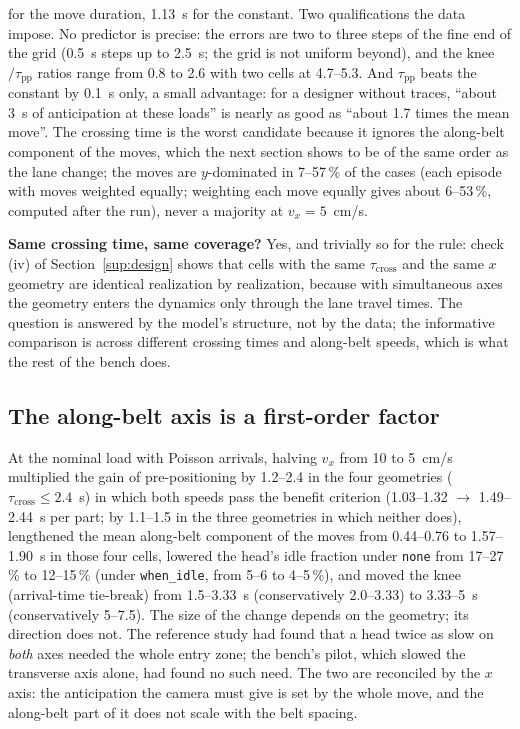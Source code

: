 \documentclass[11pt,a4paper]{article}
\newcommand{\tcross}{\tau_{\mathrm{cross}}}
\newcommand{\tpp}{\tau_{\mathrm{pp}}}
\begin{document}
for the move duration, 1.13~s for the constant. Two qualifications the data impose. No predictor
is precise: the errors are two to three steps of the fine end of the grid (0.5~s steps up to 2.5~s; the grid is not uniform beyond), and the knee$/\tpp$
ratios range from 0.8 to 2.6 with two cells at 4.7--5.3. And $\tpp$ beats the constant by
0.1~s only, a small advantage: for a designer without traces, ``about 3~s of anticipation
at these loads'' is nearly as good as ``about 1.7 times the mean move''. The crossing time is the worst candidate because it ignores
the along-belt component of the moves, which the next section shows to be of the same
order as the lane change; the moves are $y$-dominated in 7--57\,\% of the cases (each
episode with moves weighted equally; weighting each move equally gives about
6--53\,\%, computed after the run), never a majority at $v_x=5$~cm/s.

\textbf{Same crossing time, same coverage?} Yes, and trivially so for the rule: check (iv)
of Section~\ref{sup:design} shows that cells with the same $\tcross$ and the same $x$
geometry are identical realization by realization, because with simultaneous axes the
geometry enters the dynamics only through the lane travel times. The question is
answered by the model's structure, not by the data; the informative comparison is across
different crossing times and along-belt speeds, which is what the rest of the bench does.

\subsection{The along-belt axis is a first-order factor}\label{sup:vx}
At the nominal load with Poisson arrivals, halving $v_x$ from 10 to 5~cm/s multiplied
the gain of pre-positioning by 1.2--2.4 in the four geometries ($\tcross\le2.4$~s) in
which both speeds pass the benefit criterion (1.03--1.32 $\to$ 1.49--2.44~s per part; by
1.1--1.5 in the three geometries in which neither does), lengthened the mean along-belt
component of the moves from 0.44--0.76 to 1.57--1.90~s in those four cells, lowered the
head's idle fraction under \texttt{none} from 17--27\,\% to 12--15\,\% (under
\texttt{when\_idle}, from 5--6 to 4--5\,\%), and moved the knee (arrival-time tie-break) from 1.5--3.33~s
(conservatively 2.0--3.33) to 3.33--5~s (conservatively 5--7.5). The size of the change
depends on the geometry; its direction does not.
The reference study had found that a head twice as slow on \emph{both} axes needed the
whole entry zone; the bench's pilot, which slowed the transverse axis alone, had found no
such need. The two are reconciled by the $x$ axis: the anticipation the camera must give
is set by the whole move, and the along-belt part of it does not scale with the belt
spacing.
\end{document}
